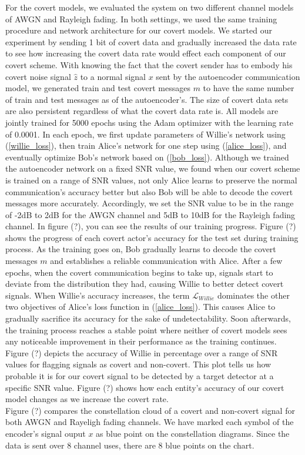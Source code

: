For the covert models, we evaluated the system on two different channel models of AWGN and Rayleigh fading. In both settings, we used the same training procedure and network architecture for our covert models. We started our experiment by sending 1 bit of covert data and gradually increased the data rate to see how increasing the covert data rate would effect each component of our covert scheme. With knowing the fact that the covert sender has to embody his covert noise signal \(\hat{z}\) to a normal signal \(x\) sent by the autoencoder communication model, we generated train and test covert messages \(m\) to have the same number of train and test messages as of the autoencoder's. The size of covert data sets are also persistent regardless of what the covert data rate is. All models are jointly trained for 5000 epochs using the Adam optimizer with the learning rate of 0.0001. In each epoch, we first update parameters of Willie's network using (\ref{willie_loss}), then train Alice's network for one step using (\ref{alice_loss}), and eventually optimize Bob's network based on (\ref{bob_loss}). Although we trained the autoencoder network on a fixed SNR value, we found when our covert scheme is trained on a range of SNR values, not only Alice learns to preserve the normal communication's accuracy better but also Bob will be able to decode the covert messages more accurately. Accordingly, we set the SNR value to be in the range of -2dB to 2dB for the AWGN channel and 5dB to 10dB for the Rayleigh fading channel.
In figure (?), you can see the results of our training progress. Figure (?) shows the progress of each covert actor's accuracy for the test set during training process. As the training goes on, Bob gradually learns to decode the covert messages \(m\) and establishes a reliable communication with Alice. After a few epochs, when the covert communication begins to take up, signals start to deviate from the distribution they had, causing Willie to better detect covert signals. When Willie's accuracy increases, the term \(\mathcal{L}_{Willie}\) dominates the other two objectives of Alice's loss function in (\ref{alice_loss}). This causes Alice to gradually sacrifice its accuracy for the sake of undetectability. Soon afterwards, the training process reaches a stable point where neither of covert models sees any noticeable improvement in their performance as the training continues. Figure (?) depicts the accuracy of Willie in percentage over a range of SNR values for flagging signals as covert and non-covert. This plot tells us how probable it is for our covert signal to be detected by a target detector at a specific SNR value. Figure (?) shows how each entity's accuracy of our covert model changes as we increase the covert rate.\\
Figure (?) compares the constellation cloud of a covert and non-covert signal for both AWGN and Rayeligh fading channels. We have marked each symbol of the encoder's signal ouput \(x\) as blue point on the constellation diagrams. Since the data is sent over 8 channel uses, there are 8 blue points on the chart.